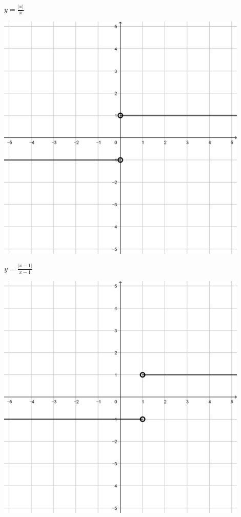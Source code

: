 \documentclass[a4paper]{oblivoir}
\begin{document}
\clearpage
\begin{minipage}{0.45\textwidth}\centering
\(y=\frac{|x|}{x}\)
\par\bigskip\includegraphics[width=0.9\textwidth]{img/17-1}
\end{minipage}
\begin{minipage}{0.45\textwidth}\centering
\(y=\frac{|x-1|}{x-1}\)
\par\bigskip\includegraphics[width=0.9\textwidth]{img/17-2}
\end{minipage}\bigskip\bigskip\par
\end{document}
